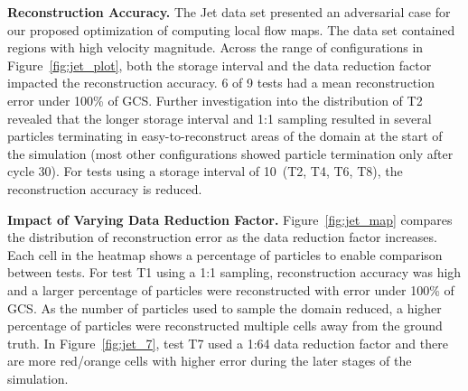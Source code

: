 

\textbf{Reconstruction Accuracy.} The Jet data set presented an adversarial case for our proposed optimization of computing local flow maps.
%
The data set contained regions with high velocity magnitude.
%
Across the range of configurations in Figure~\ref{fig:jet_plot}, both the storage interval and the data reduction factor impacted the reconstruction accuracy.
%
6 of 9 tests had a mean reconstruction error under 100\% of GCS. 
%
Further investigation into the distribution of T2 revealed that the longer storage interval and 1:1 sampling resulted in several particles terminating in easy-to-reconstruct areas of the domain at the start of the simulation (most other configurations showed particle termination only after cycle 30).
%
For tests using a storage interval of 10~(T2, T4, T6, T8), the reconstruction accuracy is reduced.
%
%
%
%
%

\textbf{Impact of Varying Data Reduction Factor.} Figure~\ref{fig:jet_map} compares the distribution of reconstruction error as the data reduction factor increases. 
%
Each cell in the heatmap shows a percentage of particles to enable comparison between tests.
%
For test T1 using a 1:1 sampling, reconstruction accuracy was high and a larger percentage of particles were reconstructed with error under 100\% of GCS.
%
As the number of particles used to sample the domain reduced, a higher percentage of particles were reconstructed multiple cells away from the ground truth. 
%
In Figure~\ref{fig:jet_7}, test T7 used a 1:64 data reduction factor and there are more red/orange cells with higher error during the later stages of the simulation. 
%
\fix{Figure~\ref{jet_ftle} visualizes an FTLE field derived using the T1~(1:1) and T3~(1:8) Lagrangian$_{Local}$ flow maps.
%
Although for both tests the overall FTLE ridge structure can be visualized, for T3 using fewer particles, the loss of accuracy due to discarded trajectories is more evident. 
%
}%
%
%
%
%
